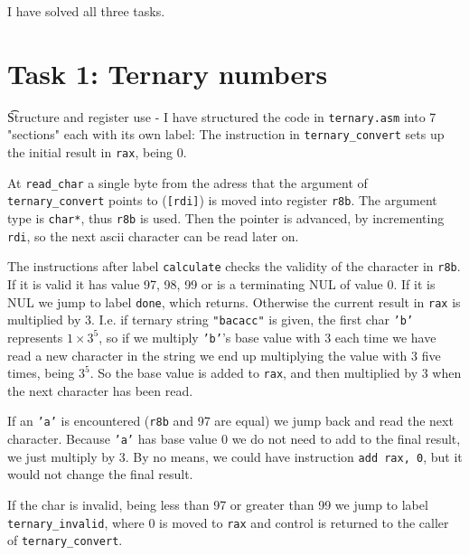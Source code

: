 I have solved all three tasks.
\section*{Task 1: Ternary numbers}
\t{Structure and register use} -
I have structured the code in \texttt{ternary.asm} into 7 "sections" each with
its own label:
The instruction in \texttt{ternary\_convert} sets up the initial result in
\texttt{rax}, being 0.

    At \texttt{read\_char} a single byte from the adress that the argument of
    \texttt{ternary\_convert}
    points to (\texttt{[rdi]}) is moved into
    register \texttt{r8b}. The argument type is \texttt{char*}, thus
    \texttt{r8b} is used.
    Then the pointer is advanced, by incrementing \texttt{rdi}, so the next
    ascii character can be read later on.

    The instructions after label \texttt{calculate} checks the validity of the
    character in \texttt{r8b}. If it is valid it has value 97, 98, 99 or is a
    terminating NUL of value 0. If it is NUL
    we jump to label \texttt{done}, which returns.
    Otherwise the current result in \texttt{rax} is multiplied by 3. I.e. if ternary
    string \texttt{"bacacc"} is given, the first char \texttt{'b'} represents
    $1\times 3^5$, so if we multiply \texttt{'b'}'s base value with 3 each time we
    have read a new character in the string we end up multiplying the value
    with 3 five times, being $3^5$. So the base value is added to \texttt{rax},
    and then multiplied by 3 when the next character has been read.

    If an \texttt{'a'} is encountered (\texttt{r8b} and 97 are equal) we
    jump back and read the next character. Because \texttt{'a'} has
    base value 0 we do not need to add to the final result, we just multiply
    by 3. By no means, we could have instruction \texttt{add rax, 0}, but it
    would not change the final result.

    If the char is invalid, being less than 97 or greater than 99 we jump to
    label \texttt{ternary\_invalid}, where 0 is moved to \texttt{rax}
    and control is returned to the caller of
    \texttt{ternary\_convert}.

